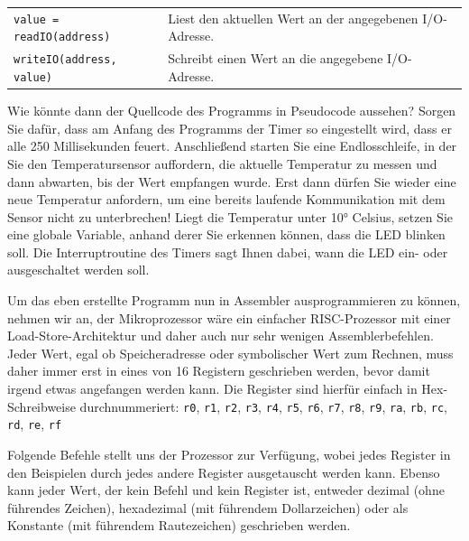 \bigskip
{
    \setlength{\tabcolsep}{0pt}
    \small

    \begin{tabularx}{\textwidth}{p{}X}
        \texttt{value = readIO(address)}
        &
        Liest den aktuellen Wert an der angegebenen I/O-Adresse.
        \\

        \texttt{writeIO(address, value)}
        &
        Schreibt einen Wert an die angegebene I/O-Adresse.
        \\
    \end{tabularx}
}

Wie könnte dann der Quellcode des Programms in Pseudocode aussehen? Sorgen Sie
dafür, dass am Anfang des Programms der Timer so eingestellt wird, dass er alle
250 Millisekunden feuert. Anschließend starten Sie eine Endlosschleife, in der
Sie den Temperatursensor auffordern, die aktuelle Temperatur zu messen und dann
abwarten, bis der Wert empfangen wurde. Erst dann dürfen Sie wieder eine neue
Temperatur anfordern, um eine bereits laufende Kommunikation mit dem Sensor nicht
zu unterbrechen! Liegt die Temperatur unter 10° Celsius, setzen Sie eine globale
Variable, anhand derer Sie erkennen können, dass die LED blinken soll. Die
Interruptroutine des Timers sagt Ihnen dabei, wann die LED ein- oder ausgeschaltet
werden soll.

\clearpage
\teilaufgabe
Um das eben erstellte Programm nun in Assembler ausprogrammieren zu können,
nehmen wir an, der Mikroprozessor wäre ein einfacher RISC-Prozessor mit einer
Load-Store-Architektur und daher auch nur sehr wenigen Assemblerbefehlen. Jeder
Wert, egal ob Speicheradresse oder symbolischer Wert zum Rechnen, muss daher
immer erst in eines von 16 Registern geschrieben werden, bevor damit irgend
etwas angefangen werden kann. Die Register sind hierfür einfach in Hex-Schreibweise
durchnummeriert:
\texttt{r0}, \texttt{r1}, \texttt{r2}, \texttt{r3}, \texttt{r4}, \texttt{r5},
\texttt{r6}, \texttt{r7}, \texttt{r8}, \texttt{r9}, \texttt{ra}, \texttt{rb},
\texttt{rc}, \texttt{rd}, \texttt{re}, \texttt{rf}

Folgende Befehle stellt uns der Prozessor zur Verfügung, wobei jedes Register
in den Beispielen durch jedes andere Register ausgetauscht werden kann. Ebenso
kann jeder Wert, der kein Befehl und kein Register ist, entweder dezimal (ohne
führendes Zeichen), hexadezimal (mit führendem Dollarzeichen) oder als Konstante
(mit führendem Rautezeichen) geschrieben werden.

